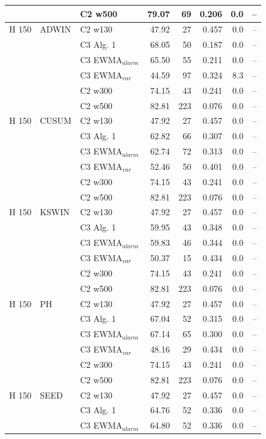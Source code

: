 \begin{longtable}{lllrrrrr}
 &  & C2 w500 & 79.07 & 69 & 0.206 & 0.0 & -- \\
\hline
H  150 & ADWIN & C2 w130 & 47.92 & 27 & 0.457 & 0.0 & -- \\
 &  & C3 Alg. 1 & 68.05 & 50 & 0.187 & 0.0 & -- \\
 &  & C3 EWMA$_{alarm}$ & 65.50 & 55 & 0.211 & 0.0 & -- \\
 &  & C3 EWMA$_{var}$ & 44.59 & 97 & 0.324 & 8.3 & -- \\
 &  & C2 w300 & 74.15 & 43 & 0.241 & 0.0 & -- \\
 &  & C2 w500 & 82.81 & 223 & 0.076 & 0.0 & -- \\
\hline
H  150 & CUSUM & C2 w130 & 47.92 & 27 & 0.457 & 0.0 & -- \\
 &  & C3 Alg. 1 & 62.82 & 66 & 0.307 & 0.0 & -- \\
 &  & C3 EWMA$_{alarm}$ & 62.74 & 72 & 0.313 & 0.0 & -- \\
 &  & C3 EWMA$_{var}$ & 52.46 & 50 & 0.401 & 0.0 & -- \\
 &  & C2 w300 & 74.15 & 43 & 0.241 & 0.0 & -- \\
 &  & C2 w500 & 82.81 & 223 & 0.076 & 0.0 & -- \\
\hline
H  150 & KSWIN & C2 w130 & 47.92 & 27 & 0.457 & 0.0 & -- \\
 &  & C3 Alg. 1 & 59.95 & 43 & 0.348 & 0.0 & -- \\
 &  & C3 EWMA$_{alarm}$ & 59.83 & 46 & 0.344 & 0.0 & -- \\
 &  & C3 EWMA$_{var}$ & 50.37 & 15 & 0.434 & 0.0 & -- \\
 &  & C2 w300 & 74.15 & 43 & 0.241 & 0.0 & -- \\
 &  & C2 w500 & 82.81 & 223 & 0.076 & 0.0 & -- \\
\hline
H  150 & PH & C2 w130 & 47.92 & 27 & 0.457 & 0.0 & -- \\
 &  & C3 Alg. 1 & 67.04 & 52 & 0.315 & 0.0 & -- \\
 &  & C3 EWMA$_{alarm}$ & 67.14 & 65 & 0.300 & 0.0 & -- \\
 &  & C3 EWMA$_{var}$ & 48.16 & 29 & 0.434 & 0.0 & -- \\
 &  & C2 w300 & 74.15 & 43 & 0.241 & 0.0 & -- \\
 &  & C2 w500 & 82.81 & 223 & 0.076 & 0.0 & -- \\
\hline
H  150 & SEED & C2 w130 & 47.92 & 27 & 0.457 & 0.0 & -- \\
 &  & C3 Alg. 1 & 64.76 & 52 & 0.336 & 0.0 & -- \\
 &  & C3 EWMA$_{alarm}$ & 64.80 & 52 & 0.336 & 0.0 & -- \\

\end{longtable}
